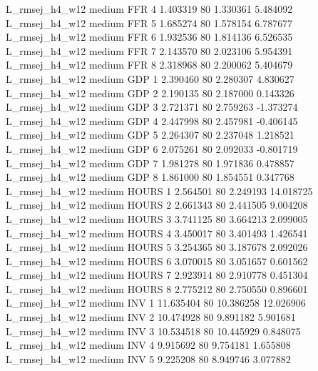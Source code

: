 L_rmsej_h4_w12     medium      FFR                 4  1.403319 80       1.330361           5.484092
L_rmsej_h4_w12     medium      FFR                 5  1.685274 80       1.578154           6.787677
L_rmsej_h4_w12     medium      FFR                 6  1.932536 80       1.814136           6.526535
L_rmsej_h4_w12     medium      FFR                 7  2.143570 80       2.023106           5.954391
L_rmsej_h4_w12     medium      FFR                 8  2.318968 80       2.200062           5.404679
L_rmsej_h4_w12     medium      GDP                 1  2.390460 80       2.280307           4.830627
L_rmsej_h4_w12     medium      GDP                 2  2.190135 80       2.187000           0.143326
L_rmsej_h4_w12     medium      GDP                 3  2.721371 80       2.759263          -1.373274
L_rmsej_h4_w12     medium      GDP                 4  2.447998 80       2.457981          -0.406145
L_rmsej_h4_w12     medium      GDP                 5  2.264307 80       2.237048           1.218521
L_rmsej_h4_w12     medium      GDP                 6  2.075261 80       2.092033          -0.801719
L_rmsej_h4_w12     medium      GDP                 7  1.981278 80       1.971836           0.478857
L_rmsej_h4_w12     medium      GDP                 8  1.861000 80       1.854551           0.347768
L_rmsej_h4_w12     medium    HOURS                 1  2.564501 80       2.249193          14.018725
L_rmsej_h4_w12     medium    HOURS                 2  2.661343 80       2.441505           9.004208
L_rmsej_h4_w12     medium    HOURS                 3  3.741125 80       3.664213           2.099005
L_rmsej_h4_w12     medium    HOURS                 4  3.450017 80       3.401493           1.426541
L_rmsej_h4_w12     medium    HOURS                 5  3.254365 80       3.187678           2.092026
L_rmsej_h4_w12     medium    HOURS                 6  3.070015 80       3.051657           0.601562
L_rmsej_h4_w12     medium    HOURS                 7  2.923914 80       2.910778           0.451304
L_rmsej_h4_w12     medium    HOURS                 8  2.775212 80       2.750550           0.896601
L_rmsej_h4_w12     medium      INV                 1 11.635404 80      10.386258          12.026906
L_rmsej_h4_w12     medium      INV                 2 10.474928 80       9.891182           5.901681
L_rmsej_h4_w12     medium      INV                 3 10.534518 80      10.445929           0.848075
L_rmsej_h4_w12     medium      INV                 4  9.915692 80       9.754181           1.655808
L_rmsej_h4_w12     medium      INV                 5  9.225208 80       8.949746           3.077882
